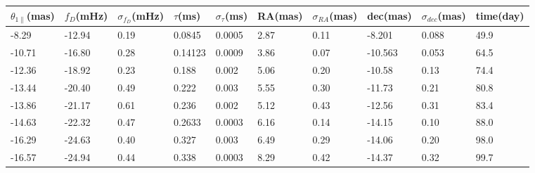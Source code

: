 \documentclass[useAMS,usenatbib]{mn2e}
\begin{document}
\begin{table}
\centering
\begin{tabular}{llllllllll}
\hline
$\theta_{1\parallel}$(mas) &$f_D$(mHz) & $\sigma_{f_D}$(mHz) & $\tau$(ms) & $\sigma_{\tau}$(ms) & RA(mas) & $\sigma_{RA}$(mas) & dec(mas) & $\sigma_{dec}$(mas) & time(day)\\
\hline
 -8.29   & -12.94                            & 0.19      & 0.0845  & 0.0005          & 2.87    & 0.11                                     & -8.201     & 0.088      & 49.9                                \\

-10.71   &-16.80                             & 0.28      & 0.14123 & 0.0009         & 3.86    & 0.07                                     & -10.563    & 0.053      &64.5                                \\

-12.36   &-18.92                            & 0.23      & 0.188   & 0.002           & 5.06    & 0.20                                      & -10.58    & 0.13      &74.4                        \\

-13.44 & -20.40                             & 0.49      & 0.222   & 0.003           & 5.55    & 0.30                                      & -11.73    & 0.21      &80.8                                \\

-13.86 &-21.17                            & 0.61      & 0.236   & 0.002           & 5.12    & 0.43                                     & -12.56    & 0.31      &83.4                                \\

-14.63   &-22.32                            & 0.47      & 0.2633  & 0.0003          & 6.16    & 0.14                                     & -14.15    & 0.10       &88.0                                \\

-16.29   &-24.63                            & 0.40       & 0.327  & 0.003          & 6.49    & 0.29                                     & -14.06    & 0.20       &98.0                                \\

-16.57  &-24.94                            & 0.44      & 0.338 & 0.0003         & 8.29    & 0.42                                     & -14.37    & 0.32      &99.7                                \\


\end{tabular}
\end{table}
\end{document}
